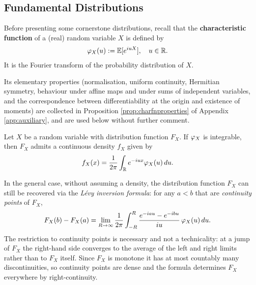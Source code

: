 
    
    

\subsection{Fundamental Distributions}\label{subsec:FundamentalDistr}

Before presenting some cornerstone distributions, recall that the \textbf{characteristic function} of a (real) random variable $X$ is defined by
\begin{equation}
\varphi_X(u) := \mathbb{E}[e^{i u X}], \quad u \in \mathbb{R}.
\end{equation}
It is the Fourier transform of the probability distribution of $X$.

Its elementary properties (normalisation, uniform continuity, Hermitian symmetry, behaviour under
affine maps and under sums of independent variables, and the correspondence between differentiability
at the origin and existence of moments) are collected in Proposition \ref{prop:charfnproperties}
of Appendix \ref{app:auxiliary}, and are used below without further comment.

\begin{theorem}\label{thm:fourierinversion}
Let $X$ be a random variable with distribution function $F_X$. If $\varphi_X$ is integrable, then $F_X$ admits a continuous density $f_X$ given by
\begin{equation}
f_X(x) = \frac{1}{2\pi} \int_{\mathbb{R}} e^{-i u x} \varphi_X(u) \, du.
\end{equation}
\qedopen
\end{theorem}

In the general case, without assuming a density, the distribution function $F_X$ can still be recovered via the \emph{Lévy inversion formula}: for any $a < b$ that are \emph{continuity points} of $F_X$,
\begin{equation}\label{levyInversionFormula}
F_X(b) - F_X(a) = \lim_{R \to \infty} \frac{1}{2\pi} \int_{-R}^R \frac{e^{-i a u} - e^{-i b u}}{i u} \, \varphi_X(u) \, du.
\end{equation}
The restriction to continuity points is necessary and not a technicality: at a jump of $F_X$ the right-hand side converges to the average of the left and right limits rather than to $F_X$ itself. Since $F_X$ is monotone it has at most countably many discontinuities, so continuity points are dense and the formula determines $F_X$ everywhere by right-continuity.

